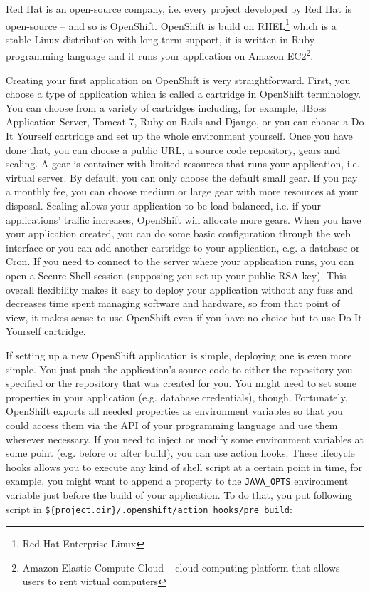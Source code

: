 Red Hat is an open-source company, i.e. every project developed by Red Hat is open-source -- and so is OpenShift. OpenShift is build on RHEL\footnote{Red Hat Enterprise Linux} which is a stable Linux distribution with long-term support, it is written in Ruby programming language and it runs your application on Amazon EC2\footnote{Amazon Elastic Compute Cloud -- cloud computing platform that allows users to rent virtual computers}.

Creating your first application on OpenShift is very straightforward. First, you choose a type of application which is called a cartridge in OpenShift terminology. You can choose from a variety of cartridges including, for example, JBoss Application Server, Tomcat 7, Ruby on Rails and Django, or you can choose a Do It Yourself cartridge and set up the whole environment yourself. Once you have done that, you can choose a public URL, a source code repository, gears and scaling. A gear is container with limited resources that runs your application, i.e. virtual server. By default, you can only choose the default small gear. If you pay a monthly fee, you can choose medium or large gear with more resources at your disposal. Scaling allows your application to be load-balanced, i.e. if your applications' traffic increases, OpenShift will allocate more gears. When you have your application created, you can do some basic configuration through the web interface or you can add another cartridge to your application, e.g. a database or Cron. If you need to connect to the server where your application runs, you can open a Secure Shell session (supposing you set up your public RSA key). This overall flexibility makes it easy to deploy your application without any fuss and decreases time spent managing software and hardware, so from that point of view, it makes sense to use OpenShift even if you have no choice but to use Do It Yourself cartridge.

If setting up a new OpenShift application is simple, deploying one is even more simple. You just push the application's source code to either the repository you specified or the repository that was created for you. You might need to set some properties in your application (e.g. database credentials), though. Fortunately, OpenShift exports all needed properties as environment variables so that you could access them via the API of your programming language and use them wherever necessary. If you need to inject or modify some environment variables at some point (e.g. before or after build), you can use action hooks. These lifecycle hooks allows you to execute any kind of shell script at a certain point in time, for example, you might want to append a property to the \texttt{JAVA\_OPTS} environment variable just before the build of your application. To do that, you put following script in \texttt{\$\{project.dir\}/.openshift/action\_hooks/pre\_build}:


